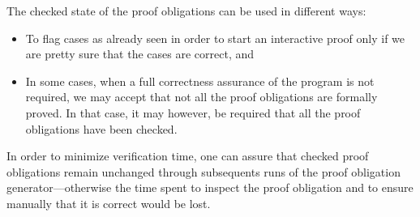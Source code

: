 The checked state of the proof obligations can be used in different
ways:
\begin{itemize}
\item To flag cases as already seen in order to start an interactive
   proof only if we are pretty sure that the cases are correct, and
\item In some cases, when a full correctness assurance of the program is not
   required, we may accept that not all the proof obligations are
   formally proved. In that case, it may however, be required that all
   the proof obligations have been checked.
\end{itemize}
In order to minimize verification time, one can assure that checked
proof obligations remain unchanged through subsequents runs of the
proof obligation generator---otherwise the time spent to inspect the
proof obligation and to ensure manually that it is correct would be
lost. 

